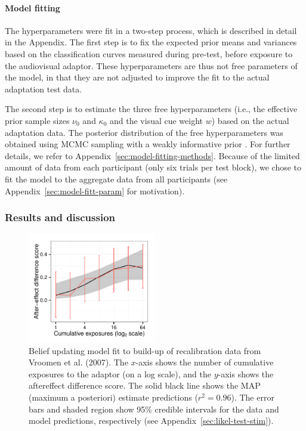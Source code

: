 \paragraph{Model fitting}
\label{sec:free-parameters}

The hyperparameters were fit in a two-step process, which is described in detail in the Appendix.  %
The first step is to fix the expected prior means and variances based on the classification curves measured during pre-test, before exposure to the audiovisual adaptor.  These hyperparameters are thus not free parameters of the model, in that they are not adjusted to improve the fit to the actual adaptation test data.

The second step is to estimate the three free hyperparameters (i.e., the effective prior sample sizes $\nu_0$ and $\kappa_0$ and the visual cue weight $w$) based on the actual adaptation data. The posterior distribution of the free hyperparameters was obtained using MCMC sampling with a weakly informative prior \autocite[to ensure a proper posterior,][]{Gelman2003}. For further details, we refer to Appendix~\ref{sec:model-fitting-methods}.
Because of the limited amount of data from each participant (only six trials per test block), we chose to fit the model to the aggregate data from all participants (see Appendix~\ref{sec:model-fitt-param} for motivation).

\subsubsection{Results and discussion}
\label{sec:results}

\begin{figure}[htb]
  \centering
  \includegraphics[width=0.5\textwidth]{figure/vroomen-recal-ae-fits-first-64.pdf}
  \caption{Belief updating model fit to build-up of recalibration data from Vroomen et al. (2007).  The $x$-axis shows the number of cumulative exposures to the adaptor (on a log scale), and the $y$-axis shows the aftereffect difference score.  The solid black line shows the MAP (maximum a posteriori) estimate predictions ($r^2=0.96$). The error bars and shaded region show 95\% credible intervals for the data and model predictions, respectively (see Appendix~\ref{sec:likel-test-stim}). }
  \label{fig:recal-buildup-preds}
\end{figure}

